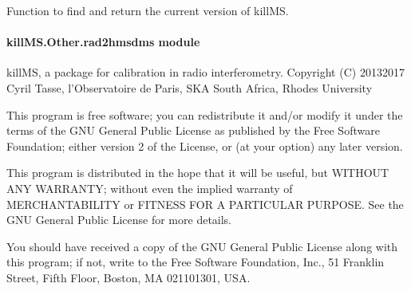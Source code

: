 \documentclass[letterpaper,10pt,english]{sphinxmanual}
\begin{document}

\begin{fulllineitems}
\label{\detokenize{api/killMS.Other:killMS.Other.logo.report_version}}
\pysigstartsignatures
{}
\pysigstopsignatures
\sphinxAtStartPar
Function to find and return the current version of killMS.
\begin{quote}\begin{description}
\sphinxAtStartPar
{}

\end{description}\end{quote}

\end{fulllineitems}



\paragraph{killMS.Other.rad2hmsdms module}
\label{\detokenize{api/killMS.Other:module-killMS.Other.rad2hmsdms}}\label{\detokenize{api/killMS.Other:killms-other-rad2hmsdms-module}}
\sphinxAtStartPar
killMS, a package for calibration in radio interferometry.
Copyright (C) 2013\sphinxhyphen{}2017  Cyril Tasse, l’Observatoire de Paris,
SKA South Africa, Rhodes University

\sphinxAtStartPar
This program is free software; you can redistribute it and/or
modify it under the terms of the GNU General Public License
as published by the Free Software Foundation; either version 2
of the License, or (at your option) any later version.

\sphinxAtStartPar
This program is distributed in the hope that it will be useful,
but WITHOUT ANY WARRANTY; without even the implied warranty of
MERCHANTABILITY or FITNESS FOR A PARTICULAR PURPOSE.  See the
GNU General Public License for more details.

\sphinxAtStartPar
You should have received a copy of the GNU General Public License
along with this program; if not, write to the Free Software
Foundation, Inc., 51 Franklin Street, Fifth Floor, Boston, MA  02110\sphinxhyphen{}1301, USA.
\end{document}
